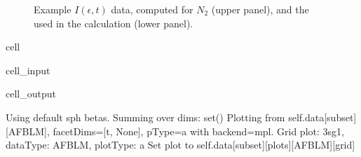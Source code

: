 \documentclass[letterpaper,table,10pt,english]{jupyterBook}
\begin{document}
\begin{figure}[htbp]
\centering
\capstart

\noindent{}
\caption{Example \(I(\epsilon,t)\) data, computed for \(N_2\) (upper panel), and the {\hyperref[\detokenize{backmatter/glossary:term-ADMs}]{}} used in the calculation (lower panel).}\label{\detokenize{part1/theory_observables_intro_100723:fig-n2blmtdemo}}\end{figure}

\begin{sphinxuseclass}{cell}\begin{sphinxVerbatimInput}

\begin{sphinxuseclass}{cell_input}
\begin{sphinxVerbatim}[commandchars=\\\{\}]
    
     
                  
               
\end{sphinxVerbatim}

\end{sphinxuseclass}\end{sphinxVerbatimInput}
\begin{sphinxVerbatimOutput}

\begin{sphinxuseclass}{cell_output}
\begin{sphinxVerbatim}[commandchars=\\\{\}]
Using default sph betas.
Summing over dims: set()
Plotting from self.data[subset][AFBLM], facetDims=[\PYGZsq{}t\PYGZsq{}, None], pType=a with backend=mpl.
Grid plot: 3sg\PYGZhy{}1, dataType: AFBLM, plotType: a
Set plot to self.data[\PYGZsq{}subset\PYGZsq{}][\PYGZsq{}plots\PYGZsq{}][\PYGZsq{}AFBLM\PYGZsq{}][\PYGZsq{}grid\PYGZsq{}]
\end{sphinxVerbatim}


\end{sphinxuseclass}
\end{sphinxVerbatimOutput}
\end{sphinxuseclass}
\end{document}
